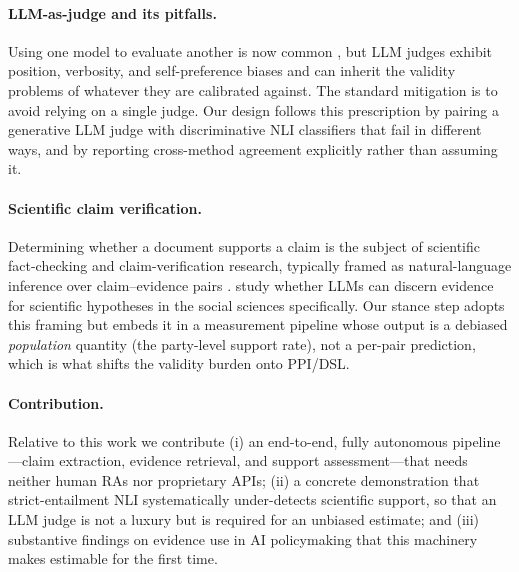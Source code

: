 \paragraph{LLM-as-judge and its pitfalls.} Using one model to evaluate another is now common
\citep{zheng2023judging}, but LLM judges exhibit position, verbosity, and self-preference biases
and can inherit the validity problems of whatever they are calibrated against. The standard
mitigation is to avoid relying on a single judge. Our design follows this prescription by pairing a
generative LLM judge with discriminative NLI classifiers that fail in different ways, and by
reporting cross-method agreement explicitly rather than assuming it.

\paragraph{Scientific claim verification.} Determining whether a document supports a claim is the
subject of scientific fact-checking and claim-verification research, typically framed as
natural-language inference over claim--evidence pairs \citep{williams2018broad,yin2019benchmarking,wadden2020fact}.
\citet{koneru2024llm} study whether LLMs can discern evidence for scientific hypotheses in the
social sciences specifically. Our stance step adopts this framing but embeds it in a measurement
pipeline whose output is a debiased \emph{population} quantity (the party-level support rate), not a
per-pair prediction, which is what shifts the validity burden onto PPI/DSL.

\paragraph{Contribution.} Relative to this work we contribute (i) an end-to-end, fully autonomous
pipeline---claim extraction, evidence retrieval, and support assessment---that needs neither human
RAs nor proprietary APIs; (ii) a concrete demonstration that strict-entailment NLI systematically
under-detects scientific support, so that an LLM judge is not a luxury but is required for an
unbiased estimate; and (iii) substantive findings on evidence use in AI policymaking that this
machinery makes estimable for the first time.
